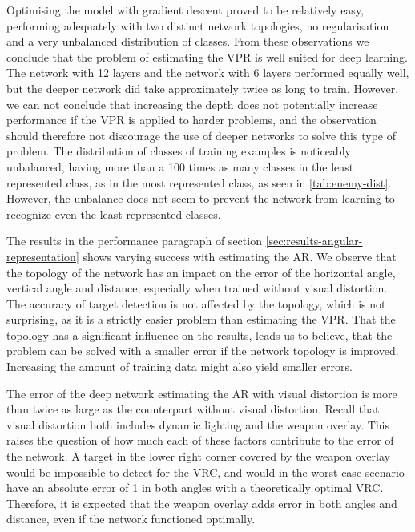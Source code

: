 Optimising the model with gradient descent proved to be relatively easy, performing adequately with two distinct network topologies, no regularisation and a very unbalanced distribution of classes. From these observations we conclude that the problem of estimating the VPR is well suited for deep learning. The network with 12 layers and the network with 6 layers performed equally well, but the deeper network did take approximately twice as long to train. However, we can not conclude that increasing the depth does not potentially increase performance if the VPR is applied to harder problems, and the observation should therefore not discourage the use of deeper networks to solve this type of problem. The distribution of classes of training examples is noticeably unbalanced, having more than a 100 times as many classes in the least represented class, as in the most represented class, as seen in \ref{tab:enemy-dist}. However, the unbalance does not seem to prevent the network from learning to recognize even the least represented classes. 

The results in the performance paragraph of section \ref{sec:results-angular-representation} shows varying success with estimating the AR. We observe that the topology of the network has an impact on the error of the horizontal angle, vertical angle and distance, especially when trained without visual distortion. The accuracy of target detection is not affected by the topology, which is not surprising, as it is a strictly easier problem than estimating the VPR. That the topology has a significant influence on the results, leads us to believe, that the problem can be solved with a smaller error if the network topology is improved. Increasing the amount of training data might also yield smaller errors.

The error of the deep network estimating the AR with visual distortion is more than twice as large as the counterpart without visual distortion. Recall that visual distortion both includes dynamic lighting and the weapon overlay. This raises the question of how much each of these factors contribute to the error of the network. A target in the lower right corner covered by the weapon overlay would be impossible to detect for the VRC, and would in the worst case scenario have an absolute error of 1 in both angles with a theoretically optimal VRC. Therefore, it is expected that the weapon overlay adds error in both angles and distance, even if the network functioned optimally.

